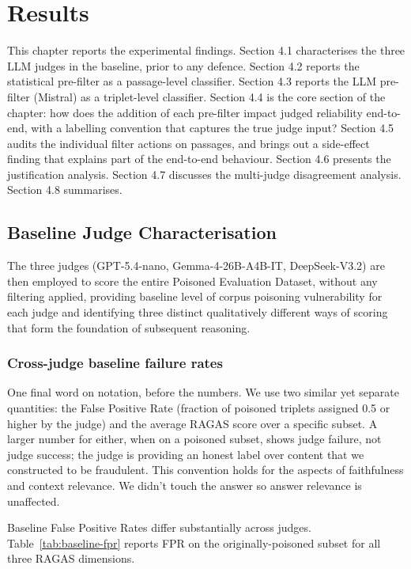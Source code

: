 \chapter{Results}

This chapter reports the experimental findings. Section 4.1 characterises the three LLM judges in the baseline, prior to any defence. Section 4.2 reports the statistical pre-filter as a passage-level classifier. Section 4.3 reports the LLM pre-filter (Mistral) as a triplet-level classifier. Section 4.4 is the core section of the chapter: how does the addition of each pre-filter impact judged reliability end-to-end, with a labelling convention that captures the true judge input? Section 4.5 audits the individual filter actions on passages, and brings out a side-effect finding that explains part of the end-to-end behaviour. Section 4.6 presents the justification analysis. Section 4.7 discusses the multi-judge disagreement analysis. Section 4.8 summarises.

\section{Baseline Judge Characterisation}

The three judges (GPT-5.4-nano, Gemma-4-26B-A4B-IT, DeepSeek-V3.2) are then employed to score the entire Poisoned Evaluation Dataset, without any filtering applied, providing baseline level of corpus poisoning vulnerability for each judge and identifying three distinct qualitatively different ways of scoring that form the foundation of subsequent reasoning.

\subsection{Cross-judge baseline failure rates}

One final word on notation, before the numbers. We use two similar yet separate quantities: the False Positive Rate (fraction of poisoned triplets assigned 0.5 or higher by the judge) and the average RAGAS score over a specific subset. A larger number for either, when on a poisoned subset, shows judge failure, not judge success; the judge is providing an honest label over content that we constructed to be fraudulent. This convention holds for the aspects of faithfulness and context relevance. We didn't touch the answer so answer relevance is unaffected.

Baseline False Positive Rates differ substantially across judges. Table~\ref{tab:baseline-fpr} reports FPR on the originally-poisoned subset for all three RAGAS dimensions.

